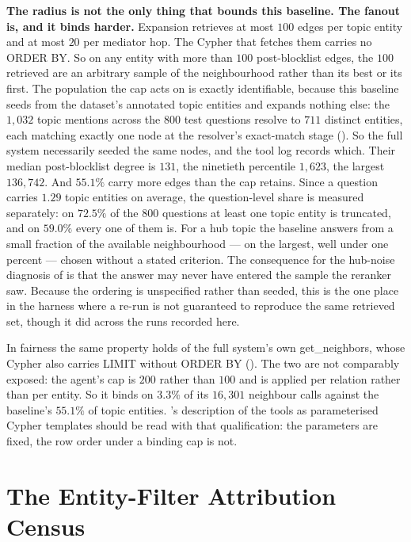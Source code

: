 \textbf{The radius is not the only thing that bounds this baseline. The fanout
is, and it binds harder.} Expansion retrieves at most $100$ edges per topic
entity and at most $20$ per mediator hop. The Cypher that fetches them
carries no \textsf{ORDER BY}. So on any entity with more than $100$
post-blocklist edges, the $100$ retrieved are an arbitrary sample of the
neighbourhood rather than its best or its first. The population the cap acts on
is exactly identifiable, because this baseline seeds from the dataset's
annotated topic entities and expands nothing else: the $1{,}032$ topic mentions
across the $800$ test questions resolve to $711$ distinct entities, each
matching exactly one node at the resolver's exact-match stage
(). So the full system necessarily seeded the same
nodes, and the tool log records which. Their median post-blocklist degree is
$131$, the ninetieth percentile $1{,}623$, the largest $136{,}742$. And $55.1\%$
carry more edges than the cap retains. Since a question carries $1.29$ topic
entities on average, the question-level share is measured separately: on
$72.5\%$ of the $800$ questions at least one topic entity is truncated, and on
$59.0\%$ every one of them is. For a hub topic the baseline answers from a small
fraction of the available neighbourhood --- on the largest, well under one
percent --- chosen without a stated criterion. The consequence for the hub-noise
diagnosis of  is that the answer may never have entered
the sample the reranker saw. Because the ordering is unspecified rather than
seeded, this is the one place in the harness where a re-run is not guaranteed to
reproduce the same retrieved set, though it did across the runs recorded here.

In fairness the same property holds of the full system's own
\textsf{get\_neighbors}, whose Cypher also carries \textsf{LIMIT} without
\textsf{ORDER BY} (). The two are not comparably
exposed: the agent's cap is $200$ rather than $100$ and is applied per relation
rather than per entity. So it binds on $3.3\%$ of its $16{,}301$ neighbour calls
against the baseline's $55.1\%$ of topic entities. 's
description of the tools as parameterised Cypher templates should be read with
that qualification: the parameters are fixed, the row order under a binding cap
is not.


\section{The Entity-Filter Attribution Census}\label{app:filter-census}

